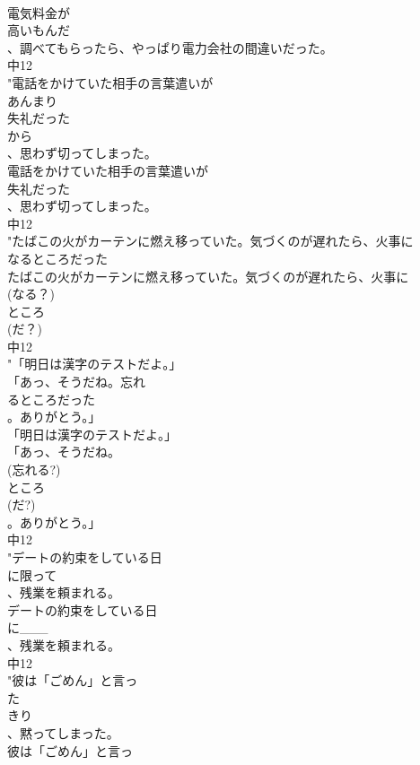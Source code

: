 \documentclass[8pt]{extreport}
\begin{document}
\begin{CJK}{UTF8}{min}
\\	電気料金が
\\	高いもんだ
\\	、調べてもらったら、やっぱり電力会社の間違いだった。
\\	中12
\\	"電話をかけていた相手の言葉遣いが
\\	あんまり
\\	失礼だった
\\	から
\\	、思わず切ってしまった。
\\	電話をかけていた相手の言葉遣いが
\\	失礼だった
\\	、思わず切ってしまった。
\\	中12
\\	"たばこの火がカーテンに燃え移っていた。気づくのが遅れたら、火事に
\\	なるところだった
\\	たばこの火がカーテンに燃え移っていた。気づくのが遅れたら、火事に
\\	(なる？)
\\	ところ
\\	(だ？)
\\	中12
\\	"「明日は漢字のテストだよ。」
\\	「あっ、そうだね。忘れ
\\	るところだった
\\	。ありがとう。」
\\	「明日は漢字のテストだよ。」
\\	「あっ、そうだね。
\\	(忘れる?)
\\	ところ
\\	(だ?)
\\	。ありがとう。」
\\	中12
\\	"デートの約束をしている日
\\	に限って
\\	、残業を頼まれる。
\\	デートの約束をしている日
\\	に___
\\	、残業を頼まれる。
\\	中12
\\	"彼は「ごめん」と言っ
\\	た
\\	きり
\\	、黙ってしまった。
\\	彼は「ごめん」と言っ

\end{CJK}
\end{document}
